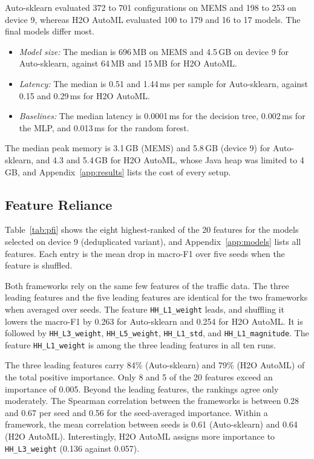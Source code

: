 Auto-sklearn evaluated 372 to 701 configurations on MEMS and 198 to 253 on device 9, whereas H2O AutoML evaluated 100 to 179 and 16 to 17 models. The final models differ most.
\begin{itemize}
\item \emph{Model size:} The median is 696\,MB on MEMS and 4.5\,GB on device 9 for Auto-sklearn, against 64\,MB and 15\,MB for H2O AutoML.
\item \emph{Latency:} The median is 0.51 and 1.44\,ms per sample for Auto-sklearn, against 0.15 and 0.29\,ms for H2O AutoML.
\item \emph{Baselines:} The median latency is 0.0001\,ms for the decision tree, 0.002\,ms for the MLP, and 0.013\,ms for the random forest.
\end{itemize}
The median peak memory is 3.1\,GB (MEMS) and 5.8\,GB (device 9) for Auto-sklearn, and 4.3 and 5.4\,GB for H2O AutoML, whose Java heap was limited to 4\,GB, and Appendix~\ref{app:results} lists the cost of every setup.


\subsection{Feature Reliance}
Table~\ref{tab:pfi} shows the eight highest-ranked of the 20 features for the models selected on device 9 (deduplicated variant), and Appendix~\ref{app:models} lists all features. Each entry is the mean drop in macro-F1 over five seeds when the feature is shuffled.

Both frameworks rely on the same few features of the traffic data. The three leading features and the five leading features are identical for the two frameworks when averaged over seeds. The feature \texttt{HH\_L1\_weight} leads, and shuffling it lowers the macro-F1 by 0.263 for Auto-sklearn and 0.254 for H2O AutoML. It is followed by \texttt{HH\_L3\_weight}, \texttt{HH\_L5\_weight}, \texttt{HH\_L1\_std}, and \texttt{HH\_L1\_magnitude}. The feature \texttt{HH\_L1\_weight} is among the three leading features in all ten runs.

The three leading features carry 84\% (Auto-sklearn) and 79\% (H2O AutoML) of the total positive importance. Only 8 and 5 of the 20 features exceed an importance of 0.005. Beyond the leading features, the rankings agree only moderately. The Spearman correlation between the frameworks is between 0.28 and 0.67 per seed and 0.56 for the seed-averaged importance. Within a framework, the mean correlation between seeds is 0.61 (Auto-sklearn) and 0.64 (H2O AutoML). Interestingly, H2O AutoML assigns more importance to \texttt{HH\_L3\_weight} (0.136 against 0.057).

